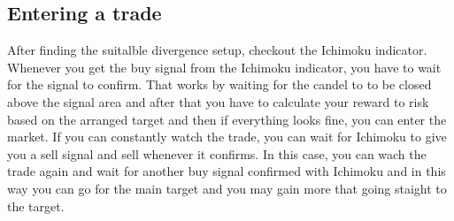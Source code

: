 \documentclass[10pt]{article}
\renewcommand{\section}[1]{\pagebreak[3]%
\hyphenpenalty=10000%
\vspace{1.3\baselineskip}%
\phantomsection\addcontentsline{toc}{section}{#1}%
\noindent\llap{\scshape\smash{\parbox[t]{\marginparwidth}{\raggedright #1}}}%
\vspace{-\baselineskip}\par}
\newenvironment{innerlist}[1][\enskip\textbullet]%
{\begin{itemize}[#1,leftmargin=*,parsep=0pt,itemsep=0pt,topsep=0pt,partopsep=0pt]}
{\end{itemize}}
\begin{document}
\subsection{Entering a trade}
After finding the suitalble divergence setup, checkout the Ichimoku indicator. Whenever you get the buy signal from the Ichimoku indicator, you have to wait for the signal to confirm. That works by waiting for the candel to to be closed above the signal area and after that you have to calculate your reward to risk based on the arranged target and then if everything looks fine, you can enter the market. If you can constantly watch the trade, you can wait for Ichimoku to give you a sell signal and sell whenever it confirms. In this case, you can wach the trade again and wait for another buy signal confirmed with Ichimoku and in this way you can go for the main target and you may gain more that going staight to the target. 














\end{document}
